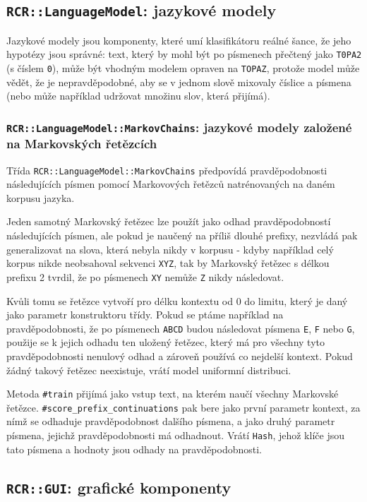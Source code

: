 \documentclass[a4paper]{article}
\begin{document}
\subsection{\texttt{RCR::LanguageModel}: jazykové modely}
Jazykové modely jsou komponenty, které umí klasifikátoru 
reálné šance, že jeho hypotézy jsou správné: text,
který by mohl být po písmenech přečtený jako \texttt{T0PA2} (s číslem
\texttt{0}), může být vhodným modelem opraven na \texttt{TOPAZ}, protože
model může vědět, že je nepravděpodobné, aby se v jednom slově mixovaly
číslice a písmena (nebo může například udržovat množinu slov, která
přijímá).


\subsubsection{\texttt{RCR::LanguageModel::MarkovChains}: jazykové modely
založené na Markovských řetězcích}
Třída \texttt{RCR::LanguageModel::MarkovChains} předpovídá pravděpodobnosti
následujících písmen pomocí Markovových řetězců natrénovaných na daném korpusu
jazyka.

Jeden samotný Markovský řetězec lze použít
jako odhad pravděpodobností následujících písmen, ale pokud je naučený
na příliš dlouhé prefixy, nezvládá pak generalizovat na slova, která nebyla
nikdy v korpusu - kdyby například celý korpus nikde neobsahoval sekvenci
\texttt{XYZ}, tak by Markovský řetězec s délkou prefixu 2 tvrdil, že po
písmenech \texttt{XY} nemůže \texttt{Z} nikdy následovat.

Kvůli tomu se řetězce vytvoří pro délku kontextu od 0 do limitu, který je daný
jako parametr konstruktoru třídy. Pokud se ptáme například na pravděpodobnosti,
že po písmenech \texttt{ABCD} budou následovat písmena \texttt{E}, \texttt{F}
nebo \texttt{G}, použije se k jejich odhadu ten uložený řetězec, který má
pro všechny tyto pravděpodobnosti nenulový odhad a zároveň používá co nejdelší
kontext. Pokud žádný takový řetězec neexistuje, vrátí model uniformní
distribuci.

Metoda \texttt{\#train} přijímá jako vstup text, na kterém naučí všechny
Markovské řetězce. \texttt{\#score\_prefix\_continuations} pak bere jako
první parametr kontext, za nímž se odhaduje pravděpodobnost dalšího písmena,
a jako druhý parametr písmena, jejichž pravděpodobnosti má odhadnout.
Vrátí \texttt{Hash}, jehož klíče jsou tato písmena a hodnoty jsou odhady
na pravděpodobnosti.

\subsection{\texttt{RCR::GUI}: grafické komponenty}
\end{document}
